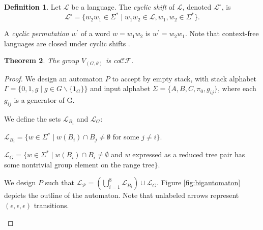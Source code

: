 \documentclass[11pt]{amsart}
\theoremstyle{plain}
\newtheorem{theorem}{Theorem}[section]
\theoremstyle{remark}
\theoremstyle{definition}
\newtheorem{definition}[theorem]{Definition}
\theoremstyle{remark}
\theoremstyle{named}
\begin{document}
\begin{definition}
Let $\mathcal{L}$ be a language. The \emph{cyclic shift} of $\mathcal{L}$, denoted $\mathcal{L}^{\circ}$, is
\[\mathcal{L}^{\circ}=\{w_2w_1 \in \Sigma^* \mid w_1w_2 \in \mathcal{L}, w_1, w_2 \in \Sigma^*\}. \]

A \emph{cyclic permutation} $w^{\prime}$ of a word $w = w_1w_2$ is $w^{\prime} = w_2w_1$. 
Note that context-free languages are closed under cyclic shifts \cite{Lehnert}.
\end{definition}



\begin{theorem} \label{main}
The group $V_{(G,\theta)}$ is co$\mathcal{C} \mathcal{F}$.
\end{theorem}

\begin{proof} 
 
We design an automaton $P$ to accept by empty stack, with stack alphabet $\Gamma = \{0, 1, g \mid g \in G \backslash \{1_G\} \}$ and input alphabet $\Sigma = \{A, B, C, \pi_0, g_{ij}\}$, where each $g_{ij}$ is a generator of G. 

We define the sets $\mathcal{L}_{B_i}$ and $\mathcal{L}_{G}$: 

$\mathcal{L}_{B_i} = \{w \in \Sigma^* \mid w(B_i) \cap B_j \not= \emptyset$ for some $j \not= i\} $.

$\mathcal{L}_{G} = \{w \in \Sigma^* \mid w(B_i) \cap B_i \not= \emptyset$ and $w$ expressed as a reduced tree pair has some nontrivial group element on the range tree$\}$.

We design $P$ such that $\mathcal{L_P}= (\mathop{\bigcup}_{i=1}^8 \mathcal{L}_{B_i}) \cup \mathcal{L}_G $. Figure \ref{fig:bigautomaton} depicts the outline of the automaton. Note that unlabeled arrows represent $(\epsilon, \epsilon, \epsilon)$ transitions.

\begin{figure}[h]
\end{figure}


\end{proof}
\end{document}
